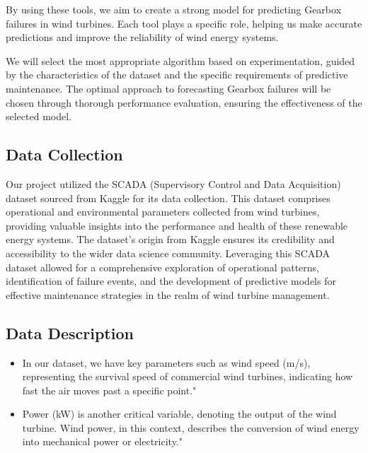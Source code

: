 \documentclass[11pt,a4paper]{article}
\begin{document}
By using these tools, we aim to create a strong model for predicting Gearbox failures in wind turbines. Each tool plays a specific role, helping us make accurate predictions and improve the reliability of wind energy systems.
\hspace{0.2cm}

We will select the most appropriate algorithm based on experimentation, guided by the characteristics of the dataset and the specific requirements of predictive maintenance. The optimal approach to forecasting Gearbox failures will be chosen through thorough performance evaluation, ensuring the effectiveness of the selected model.


\subsection{Data Collection}
Our project utilized the SCADA (Supervisory Control and Data Acquisition) dataset sourced from Kaggle for its data collection. This dataset comprises operational and environmental parameters collected from wind turbines, providing valuable insights into the performance and health of these renewable energy systems.
The dataset's origin from Kaggle ensures its credibility and accessibility to the wider data science community. Leveraging this SCADA dataset allowed for a comprehensive exploration of operational patterns, identification of failure events, and the development of predictive models for effective maintenance strategies in the realm of wind turbine management.

\subsection{Data Description}

\begin{itemize}
    \item In our dataset, we have key parameters such as wind speed (m/s), representing the survival speed of commercial wind turbines, indicating how fast the air moves past a specific point."
\end{itemize}

\begin{itemize}
    \item Power (kW) is another critical variable, denoting the output of the wind turbine. Wind power, in this context, describes the conversion of wind energy into mechanical power or electricity."
\end{itemize}
\end{document}
